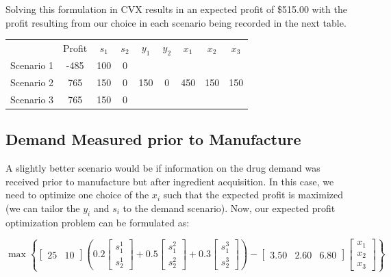 \documentclass[a4paper]{article}
\begin{document}
Solving this formulation in CVX results in an expected profit of \$515.00 with the profit resulting from our choice in each scenario being recorded in the next table.

\begin{tabular}{c  c  c c  c c c c c}
           & Profit & $s_1$ & $s_2$ & $y_1$ & $y_2$ & $x_1$ & $x_2$ & $x_3$ \\
Scenario 1 & -485   & 100   & 0     &       &       &       &       &       \\
Scenario 2 &  765   & 150   & 0     & 150   & 0     & 450   & 150   & 150   \\
Scenario 3 &  765   & 150   & 0     &       &       &       &       &       \\
\end{tabular}

\subsection{Demand Measured prior to Manufacture}
A slightly better scenario would be if information on the drug demand was received prior to manufacture but after ingredient acquisition.
In this case, we need to optimize one choice of the $x_i$ such that the expected profit is maximized (we can tailor the $y_i$ and $s_i$ to the demand scenario).
Now, our expected profit optimization problem can be formulated as:

\begin{equation}
\max \left \{ [\begin{matrix}25 & 10\end{matrix}]
\left( 0.2 \left [\begin{matrix}s_1^1 \\ s_2^1 \end{matrix} \right ] + 0.5 \left [\begin{matrix}s_1^2 \\ s_2^2 \end{matrix} \right ] + 0.3 \left [\begin{matrix}s_1^3 \\ s_2^3 \end{matrix} \right ] \right)
-[\begin{matrix}3.50 & 2.60 & 6.80\end{matrix}] \left [\begin{matrix}x_1 \\ x_2 \\ x_3 \end{matrix} \right ]
\right \}
\end{equation}
\end{document}
